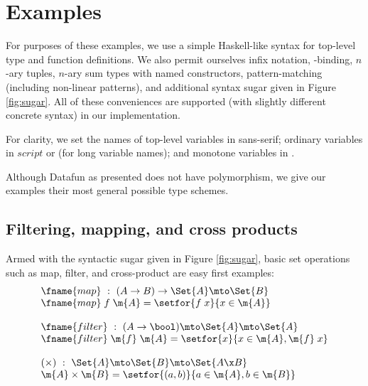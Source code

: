 
\section{Examples}

For purposes of these examples, we use a simple Haskell-like syntax for
top-level type and function definitions. We also permit ourselves infix
notation, -binding, $n$-ary tuples, $n$-ary sum types with named
constructors, pattern-matching (including non-linear patterns), and additional
syntax sugar given in Figure \ref{fig:sugar}. All of these conveniences are
supported (with slightly different concrete syntax) in our implementation.


For clarity, we set the names of top-level variables in \textsf{sans-serif};
ordinary variables in $script$ or  (for long variable names); and
monotone variables in .

Although Datafun as presented does not have polymorphism, we give our examples
their most general possible type schemes.



\subsection{Filtering, mapping, and cross products}

Armed with the syntactic sugar given in Figure \ref{fig:sugar}, basic set
operations such as map, filter, and cross-product are easy first examples:
\[\begin{array}{l}
\fname{map} ~:~ (A \uto B) \uto \Set{A} \mto \Set{B}\\
\fname{map}\;f\;\m{A} = \setfor{f\;x}{x \in \m{A}}\\
\\
\fname{filter} ~:~ (A \uto \bool) \mto \Set{A} \mto \Set{A}\\
\fname{filter}\;\m{f}\;\m{A} = \setfor{x}{x \in \m{A}, \m{f}\; x}\\
\\
(\times) ~:~ \Set{A} \mto \Set{B} \mto \Set{A \x B}\\
\m{A} \times \m{B} = \setfor{(a,b)}{a \in \m{A}, b \in \m{B}}
\end{array}\]

